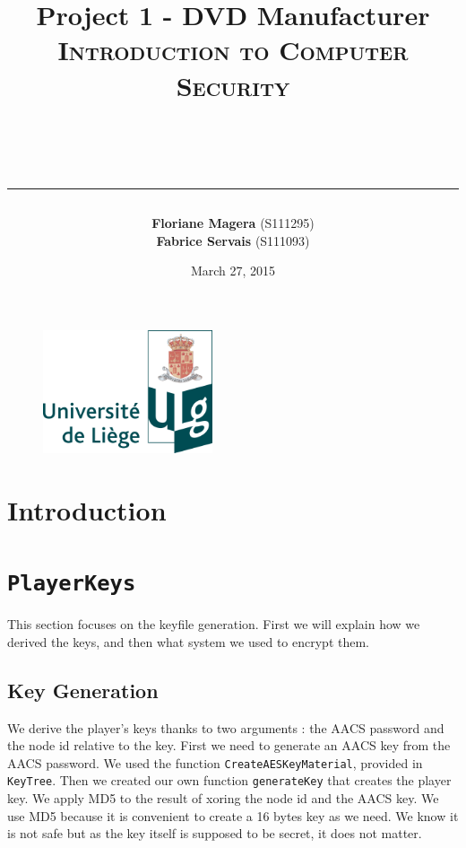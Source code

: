\documentclass[a4paper,titlepage]{article}
\begin{document}
\begin{titlepage}

\begin{figure}
\centering
\includegraphics[width=5cm]{logo-ulg.png}
\end{figure}



\title{
\vspace{0.2cm}
\LARGE{\textbf{Project 1 - DVD Manufacturer}} \\ \textsc{Introduction to Computer Security}
\author{\textbf{Floriane Magera} \small{(S111295})\\\textbf{Fabrice Servais} \small{(S111093})}\\
\date{March 27, 2015}
\rule{15cm}{1.5pt}
}

\end{titlepage}

\pagestyle{fancy}

\maketitle


\section{Introduction}

\section{\texttt{PlayerKeys}}
This section focuses on the keyfile generation. First we will explain how we derived the keys, and then what system we used to encrypt them.

	\subsection{Key Generation}
	We derive the player's keys thanks to two arguments : the AACS password and the node id relative to the key. First we need to generate an AACS 		key from the AACS password. We used the function \texttt{CreateAESKeyMaterial}, provided in \texttt{KeyTree}. Then we created our own function 		\texttt{generateKey} that creates the player key. We apply MD5 to the result of xoring the node id and the AACS key. We use MD5 because it is 		convenient to create a 16 bytes key as we need. We know it is not safe but as the key itself is supposed to be secret, it does not matter. 
	
\end{document}
